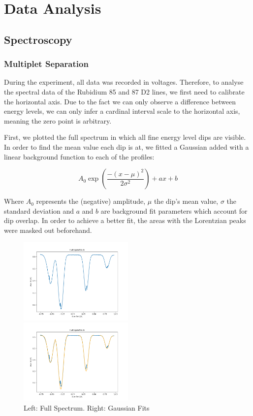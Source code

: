 \documentclass[12pt, a4paper]{article}
\let\oldexp\exp
\renewcommand{\exp}[1]{\ensuremath{\oldexp \left( #1 \right)}}
\begin{document}

\section{Data Analysis}
\subsection{Spectroscopy}
\subsubsection{Multiplet Separation}

During the experiment, all data was recorded in voltages. Therefore, to analyse the spectral data of the Rubidium 85 and 87 D2 lines, we first need to calibrate the horizontal axis. Due to the fact we can only observe a difference between energy levels, we can only infer a cardinal interval scale to the horizontal axis, meaning the zero point is arbitrary.

First, we plotted the full spectrum in which all fine energy level dips are visible. In order to find the mean value each dip is at, we fitted a Gaussian added with a linear background function to each of the profiles:

\begin{equation}
A_0 \exp{\frac{-(x - \mu)^2}{2 \sigma^2}} + ax + b
\label{gaussianfit}
\end{equation}

Where $A_0$ represents the (negative) amplitude, $\mu$ the dip's mean value, $\sigma$ the standard deviation and $a$ and $b$ are background fit parameters which account for dip overlap. In order to achieve a better fit, the areas with the Lorentzian peaks were masked out beforehand.

\begin{figure} [h]
    \centering
    \parbox{0.45\textwidth}{
        \includegraphics[width=0.5\textwidth]{fullspectrum.png}
    }
    \hfill
    \parbox{0.45\textwidth}{
        \includegraphics[width=0.5\textwidth]{fullspectrumgaussian}    
    }
    \caption{Left: Full Spectrum. Right: Gaussian Fits}
\end{figure}
\end{document}

